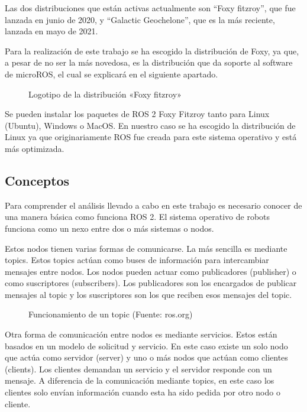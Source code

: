 \documentclass[a4paper,11pt,spanish]{sphinxmanual}
\let\sphinxpxdimen\pdfpxdimen\else\newdimen\sphinxpxdimen
\begin{document}
\sphinxAtStartPar
Las dos distribuciones que están activas actualmente son “Foxy fitzroy”,
que fue lanzada en junio de 2020, y “Galactic Geochelone”, que es la más
reciente, lanzada en mayo de 2021.

\sphinxAtStartPar
Para la realización de este trabajo se ha escogido la distribución de
Foxy, ya que, a pesar de no ser la más novedosa, es la distribución que
da soporte al software de micro\sphinxhyphen{}ROS, el cual se explicará en el
siguiente apartado.

\begin{figure}[htbp]
\centering
\capstart

\noindent\sphinxincludegraphics[width=150\sphinxpxdimen]{{Foxy}.png}
\caption{Logotipo de la distribución «Foxy fitzroy»}\label{\detokenize{software:id20}}\end{figure}

\sphinxAtStartPar
Se pueden instalar los paquetes de ROS 2 Foxy Fitzroy tanto para Linux
(Ubuntu), Windows o MacOS. En nuestro caso se ha escogido la
distribución de Linux ya que originariamente ROS fue creada para este
sistema operativo y está más optimizada.


\subsection{Conceptos}
\label{\detokenize{software:conceptos}}
\sphinxAtStartPar
Para comprender el análisis llevado a cabo en este trabajo es necesario
conocer de una manera básica como funciona ROS 2. El sistema operativo
de robots funciona como un nexo entre dos o más sistemas o nodos.

\sphinxAtStartPar
Estos nodos tienen varias formas de comunicarse. La más sencilla es
mediante topics. Estos topics actúan como buses de información para
intercambiar mensajes entre nodos. Los nodos pueden actuar como
publicadores (publisher) o como suscriptores (subscribers). Los
publicadores son los encargados de publicar mensajes al topic y los
suscriptores son los que reciben esos mensajes del topic.

\begin{figure}[htbp]
\centering
\capstart

\noindent\sphinxincludegraphics[width=400\sphinxpxdimen]{{topic_description-0}.png}
\caption{Funcionamiento de un topic (Fuente: ros.org)}\label{\detokenize{software:id21}}\end{figure}

\sphinxAtStartPar
Otra forma de comunicación entre nodos es mediante servicios. Estos
están basados en un modelo de solicitud y servicio. En este caso existe
un solo nodo que actúa como servidor (server) y uno o más nodos que
actúan como clientes (clients). Los clientes demandan un servicio y el
servidor responde con un mensaje. A diferencia de la comunicación
mediante topics, en este caso los clientes solo envían información
cuando esta ha sido pedida por otro nodo o cliente.
\end{document}
